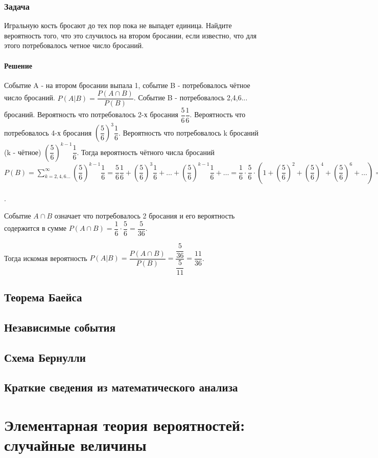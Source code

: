 \documentclass[a4paper,12pt]{article}
\begin{document}
\subsubsection*{Задача}
Игральную кость бросают до тех пор пока не выпадет единица. Найдите вероятность того, что это случилось на втором бросании, если известно, что для этого потребовалось четное число бросаний.
\paragraph{Решение}
Событие A - на втором бросании выпала 1, событие B - потребовалось чётное число бросаний. \(P(A|B)=\dfrac{P(A\cap B)}{P(B)}\). Событие B - потребовалось 2,4,6... бросаний. Вероятность что потребовалось 2-х бросания \(\dfrac{5}{6}\dfrac{1}{6}\). Вероятность что потребовалось 4-х бросания \(\left(\dfrac{5}{6}\right)^3\dfrac{1}{6}\). Вероятность что потребовалось k бросаний (k - чётное) \(\left(\dfrac{5}{6}\right)^{k-1}\dfrac{1}{6}\). Тогда вероятность чётного числа бросаний \(P(B)=\sum_{k=2,4,6...}^{\infty}\left(\dfrac{5}{6}\right)^{k-1}\dfrac{1}{6}=\dfrac{5}{6}\dfrac{1}{6}+\left(\dfrac{5}{6}\right)^3\dfrac{1}{6}+ \ldots+\left(\dfrac{5}{6}\right)^{k-1}\dfrac{1}{6}+ \ldots=\dfrac{1}{6} \cdot \dfrac{5}{6}\cdot\left(1+\left(\dfrac{5}{6}\right)^2+\left(\dfrac{5}{6}\right)^4+\left(\dfrac{5}{6}\right)^6+\ldots\right)=\dfrac{1}{6}\cdot\dfrac{5}{6}\cdot\dfrac{1}{1-\left(\dfrac{5}{6}\right)^2}=\dfrac{5}{36}\cdot\dfrac{36}{11}=\dfrac{5}{11}\). 

Событие \(A \cap B\)  означает что потребовалось 2 бросания и его вероятность содержится в сумме \( P(A\cap B)=\dfrac{1}{6}\cdot\dfrac{5}{6}=\dfrac{5}{36}\).

Тогда искомая вероятность \(P(A|B)=\dfrac{P(A\cap B)}{P(B)}=\dfrac{\dfrac{5}{36}}{\dfrac{5}{11}}=\dfrac{11}{36}\).




\subsection{Теорема Баейса}
\subsection{Независимые события}
\subsection{Схема Бернулли}
\subsection{Краткие сведения из математического анализа}


\section{Элементарная теория вероятностей: случайные величины}
\end{document}
